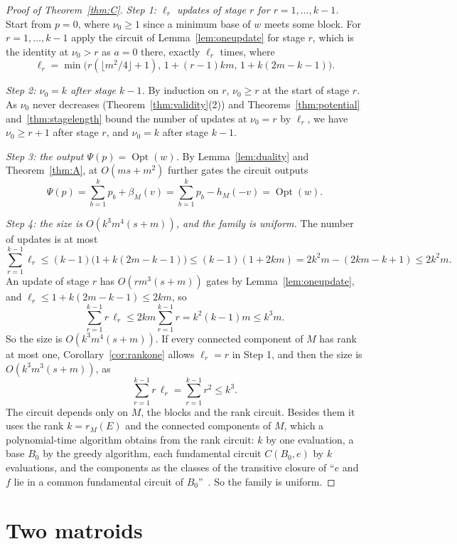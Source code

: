 \documentclass[11pt]{article}
\newcommand{\Opt}{\operatorname{Opt}}
\begin{document}
\begin{proof}[Proof of Theorem~\ref{thm:C}]
\emph{Step 1: $\ell_r$ updates of stage $r$ for $r=1,\ldots,k-1$.}  Start from $p=0$, where $\nu_0\ge1$ since a minimum
base of $w$ meets some block.  For $r=1,\ldots,k-1$ apply the circuit of
Lemma~\ref{lem:oneupdate} for stage $r$, which is the identity at $\nu_0>r$ as
$a=0$ there, exactly $\ell_r$ times, where
\[
  \ell_r=\min\bigl(r(\lfloor m^{2}/4\rfloor+1),\,1+(r-1)km,\,1+k(2m-k-1)\bigr).
\]

\emph{Step 2: $\nu_0=k$ after stage $k-1$.}  By induction on $r$, $\nu_0\ge r$ at the start of
stage $r$.  As $\nu_0$ never decreases (Theorem~\ref{thm:validity}(2)) and
Theorems~\ref{thm:potential} and~\ref{thm:stagelength} bound the number of
updates at $\nu_0=r$ by $\ell_r$, we have $\nu_0\ge r+1$ after stage $r$, and
$\nu_0=k$ after stage $k-1$.

\emph{Step 3: the output $\Psi(p)=\Opt(w)$.}  By Lemma~\ref{lem:duality} and Theorem~\ref{thm:A},
at $O(ms+m^{2})$ further gates the circuit outputs
\[
  \Psi(p)=\sum_{b=1}^{k}p_b+\beta_M(v)=\sum_{b=1}^{k}p_b-h_M(-v)=\Opt(w).
\]

\emph{Step 4: the size is $O(k^{3}m^{4}(s+m))$, and the family is uniform.}  The number of updates is at most
\[
  \sum_{r=1}^{k-1}\ell_r\le(k-1)\bigl(1+k(2m-k-1)\bigr)\le(k-1)(1+2km)
  =2k^{2}m-(2km-k+1)\le2k^{2}m.
\]
An update of stage $r$ has $O(rm^{3}(s+m))$ gates by Lemma~\ref{lem:oneupdate},
and $\ell_r\le1+k(2m-k-1)\le2km$, so
\[
  \sum_{r=1}^{k-1}r\,\ell_r\le2km\sum_{r=1}^{k-1}r=k^{2}(k-1)m\le k^{3}m.
\]
So the size is $O(k^{3}m^{4}(s+m))$.  If every connected component of $M$ has
rank at most one, Corollary~\ref{cor:rankone} allows $\ell_r=r$ in Step 1, and then the size is $O(k^{3}m^{3}(s+m))$, as
\[
  \sum_{r=1}^{k-1}r\,\ell_r=\sum_{r=1}^{k-1}r^{2}\le k^{3}.
\]  The circuit depends only on $M$, the
blocks and the rank circuit.  Besides them it uses the rank $k=r_M(E)$ and the
connected components of $M$, which a polynomial-time algorithm obtains from the
rank circuit: $k$ by one evaluation, a base $B_0$ by the greedy algorithm, each
fundamental circuit $C(B_0,e)$ by $k$ evaluations, and the components as the
classes of the transitive closure of ``$e$ and $f$ lie in a common fundamental
circuit of $B_0$''~\cite{oxley11}.  So the family is uniform.
\end{proof}

\section{Two matroids}
\label{sec:two}
\end{document}
